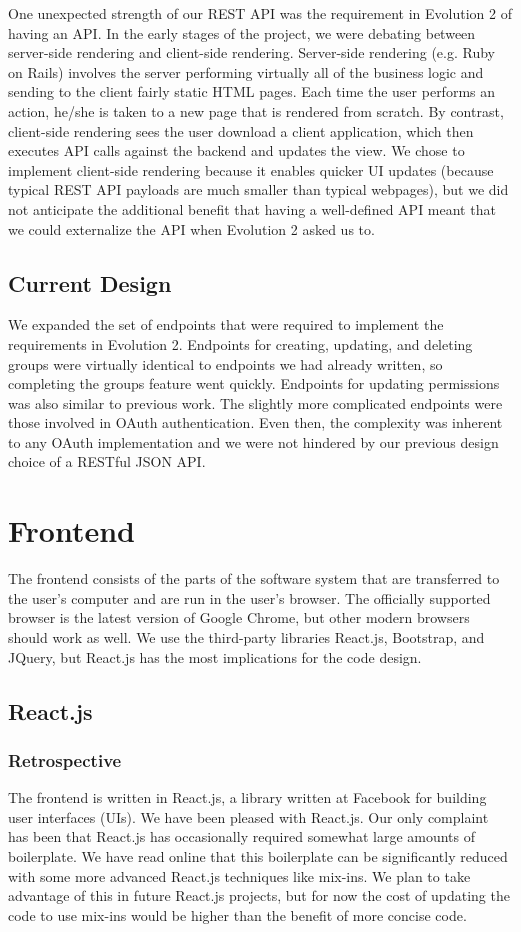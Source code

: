 \documentclass[12pt]{article}
\begin{document}
One unexpected strength of our REST API was the requirement in Evolution 2 of having an API. In the early stages of the project, we were debating between server-side rendering and client-side rendering. Server-side rendering (e.g. Ruby on Rails) involves the server performing virtually all of the business logic and sending to the client fairly static HTML pages. Each time the user performs an action, he/she is taken to a new page that is rendered from scratch. By contrast, client-side rendering sees the user download a client application, which then executes API calls against the backend and updates the view. We chose to implement client-side rendering because it enables quicker UI updates (because typical REST API payloads are much smaller than typical webpages), but we did not anticipate the additional benefit that having a well-defined API meant that we could externalize the API when Evolution 2 asked us to.

\subsection{Current Design}
We expanded the set of endpoints that were required to implement the requirements in Evolution 2. Endpoints for creating, updating, and deleting groups were virtually identical to endpoints we had already written, so completing the groups feature went quickly. Endpoints for updating permissions was also similar to previous work. The slightly more complicated endpoints were those involved in OAuth authentication. Even then, the complexity was inherent to any OAuth implementation and we were not hindered by our previous design choice of a RESTful JSON API.

\section{Frontend}
\label{sec:Frontend}
The frontend consists of the parts of the software system that are transferred to the user's computer and are run in the user's browser. The officially supported browser is the latest version of Google Chrome, but other modern browsers should work as well. We use the third-party libraries React.js, Bootstrap, and JQuery, but React.js has the most implications for the code design.

\subsection{React.js}
\subsubsection{Retrospective}
The frontend is written in React.js, a library written at Facebook for building user interfaces (UIs). We have been pleased with React.js. Our only complaint has been that React.js has occasionally required somewhat large amounts of boilerplate. We have read online that this boilerplate can be significantly reduced with some more advanced React.js techniques like mix-ins. We plan to take advantage of this in future React.js projects, but for now the cost of updating the code to use mix-ins would be higher than the benefit of more concise code.
\end{document}
